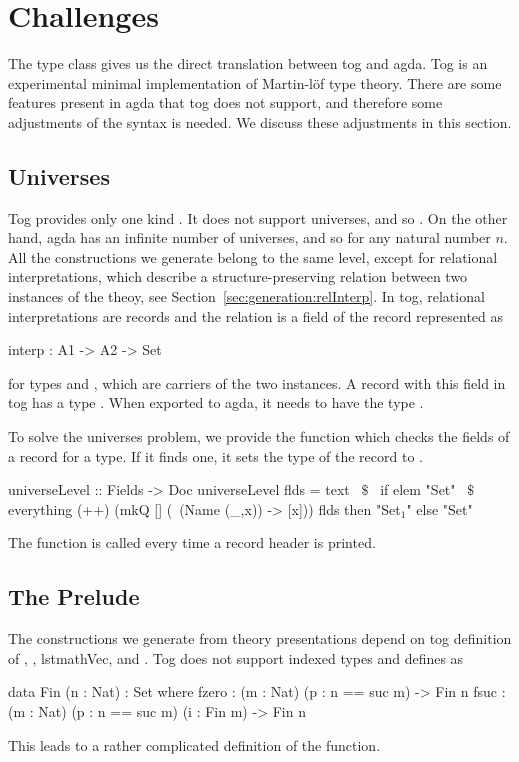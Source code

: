 \section{Challenges}
\label{sec:exporting:challenges}
The  type class gives us the direct translation between tog and agda. Tog is an experimental minimal implementation of Martin-l\"{o}f type theory. There are some features present in agda that tog does not support, and therefore some adjustments of the syntax is needed. We discuss these adjustments in this section. 

\subsection{Universes}
Tog provides only one kind . It does not support universes, and so . On the other hand, agda has an infinite number of universes, and so 
 for any natural number $n$. 
All the constructions we generate belong to the same level, except for relational interpretations, which describe a structure-preserving relation between two instances of the theoy, see Section~\ref{sec:generation:relInterp}. In tog, relational interpretations are records and the relation is a field of the record represented as 
\begin{togcode}
interp : A1 -> A2 -> Set
\end{togcode}
for types  and , which are carriers of the two instances. 
A record with this field in tog has a type . When exported to agda, it needs to have the type . 

To solve the universes problem, we provide the function  which checks the fields of a record for a  type. If it finds one, it sets the type of the record to . 
\begin{hscode}
universeLevel :: Fields -> Doc
universeLevel flds =
  text ~$\$$~
    if elem "Set" ~$\$$~ everything (++) (mkQ [] (\ (Name (_,x)) -> [x])) flds
    then "Set$_1$" else "Set" 
\end{hscode}
The function  is called every time a record header is printed. 

\subsection{The Prelude}
The constructions we generate from theory presentations depend on tog definition of , , lstmath{Vec}, and . Tog does not support indexed types and defines  as  
\begin{togcode}
data Fin (n : Nat) : Set where
  fzero : (m : Nat) (p : n == suc m) -> Fin n
  fsuc  : (m : Nat) (p : n == suc m) (i : Fin m) -> Fin n
\end{togcode}
This leads to a rather complicated definition of the  function. 

